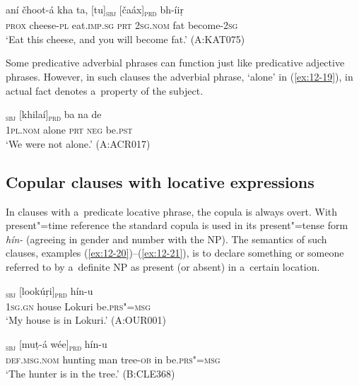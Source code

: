 \begin{exe}
\ex
\label{ex:12-18}
\gll aní čhoot-á kha ta, [tu]\textsubscript{\textsc{sbj}} [čaáx]\textsubscript{\textsc{prd}} bh-íiṛ \\
\textsc{prox} cheese-\textsc{pl} eat.\textsc{imp.sg} \textsc{prt} \textsc{2sg.nom} fat become-\textsc{2sg} \\
\glt `Eat this cheese, and you will become fat.' (A:KAT075)
\end{exe}

Some predicative adverbial phrases can function just like predicative adjective phrases. However, in such clauses the adverbial phrase, `alone' in (\ref{ex:12-19}), in actual fact denotes a~property of the subject.

\begin{exe}
\ex
\label{ex:12-19}
\gll [be]\textsubscript{\textsc{sbj}} [khilaí]\textsubscript{\textsc{prd}} ba na de \\
\textsc{1pl.nom} alone \textsc{prt} \textsc{neg} be.\textsc{pst} \\
\glt `We were not alone.' (A:ACR017)
\end{exe}


\subsection{Copular clauses with locative expressions}
\label{subsec:12-1-3}

In clauses with a~predicate locative phrase, the copula is always overt. With present"=time reference the standard copula is used in its present"=tense form \textit{hín-} (agreeing in gender and number with the NP). The semantics of such clauses, examples (\ref{ex:12-20})--(\ref{ex:12-21}), is to declare something or someone referred to by a~definite NP as present (or absent) in a~certain location.

\begin{exe}
\ex
\label{ex:12-20}
\textsubscript{\textsc{sbj}} [lookúṛi]\textsubscript{\textsc{prd}} hín-u \\
\textsc{1sg.gn} house Lokuri be.\textsc{prs"=msg} \\
\glt `My house is in Lokuri.' (A:OUR001)
\end{exe}
\begin{exe}
\ex
\label{ex:12-21}
\textsubscript{\textsc{sbj}} [muṭ-á wée]\textsubscript{\textsc{prd}} hín-u \\
\textsc{def.msg.nom} hunting man tree-\textsc{ob} in be.\textsc{prs"=msg} \\
\glt `The hunter is in the tree.' (B:CLE368)
\end{exe}


